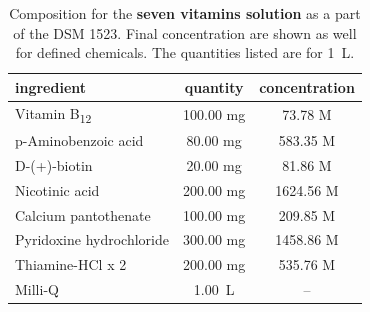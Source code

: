 
\begin{table}[ht]
	\centering
	\caption[Composition for the \textbf{seven vitamins solution} as a part of the DSM 1523.]{Composition for the \textbf{seven vitamins solution} as a part of the DSM 1523. Final concentration are shown as well for defined chemicals. The quantities listed are for 1~L.}
	\label{tab:seven_vit_sol}
	\begin{tabular}{lcc}
		\toprule
		ingredient & quantity & concentration \\
		\midrule
		Vitamin B\textsubscript{12} & 100.00 mg & 73.78 \textmu M\\
		p-Aminobenzoic acid & 80.00 mg & 583.35 \textmu M\\
		D-(+)-biotin & 20.00 mg & 81.86 \textmu M\\
		Nicotinic acid & 200.00 mg & 1624.56 \textmu M\\
		Calcium pantothenate & 100.00 mg & 209.85 \textmu M\\
		Pyridoxine hydrochloride & 300.00 mg & 1458.86 \textmu M\\
		Thiamine-HCl x 2 \ch{H2O} & 200.00 mg & 535.76 \textmu M\\
		Milli-Q \ch{H2O} & 1.00~L & -- \\
		\bottomrule	
	\end{tabular}
\end{table}